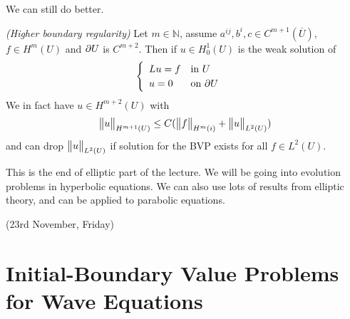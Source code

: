 \documentclass[12pt,a4paper]{report}
\begin{document}
We can still do better.
\s

\thm \emph{(Higher boundary regularity)} Let $m\in \mathbb{N}$, assume $a^{ij},b^i,c\in C^{m+1}(\overline{U})$, $f\in H^m(U)$ and $\partial U$ is $C^{m+2}$. Then if $u\in H_0^1(U)$ is the weak solution of
\begin{align*}
\begin{cases}
\begin{array}{ll}
Lu =f  & \text{in } U \\
u =0 & \text{on } \partial U
\end{array}
\end{cases}
\end{align*}
We in fact have $u\in H^{m+2}(U)$ with
\begin{align*}
\bigl\lVert u\bigr\rVert_{H^{m+1}(U)} \leq C(\bigl\lVert f\bigr\rVert_{H^{m}(i)} + \bigl\lVert u\bigr\rVert_{L^2(U)})
\end{align*}
and can drop $\bigl\lVert u\bigr\rVert_{L^2(U)}$ if solution for the BVP exists for all $f\in L^2(U)$.
\s

This is the end of elliptic part of the lecture. We will be going into evolution problems in hyperbolic equations. We can also use lots of results from elliptic theory, and can be applied to parabolic equations.
\s

\newday

(23rd November, Friday)
\s

\section*{Initial-Boundary Value Problems for Wave Equations}
\end{document}
